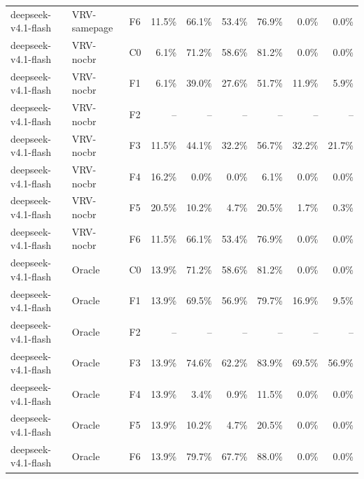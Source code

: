 \begin{tabular}{lllrrrrrr}
deepseek-v4.1-flash & VRV-samepage & F6 & 11.5\% & 66.1\% & 53.4\% & 76.9\% & 0.0\% & 0.0\% \\
deepseek-v4.1-flash & VRV-nocbr & C0 & 6.1\% & 71.2\% & 58.6\% & 81.2\% & 0.0\% & 0.0\% \\
deepseek-v4.1-flash & VRV-nocbr & F1 & 6.1\% & 39.0\% & 27.6\% & 51.7\% & 11.9\% & 5.9\% \\
deepseek-v4.1-flash & VRV-nocbr & F2 & -- & -- & -- & -- & -- & -- \\
deepseek-v4.1-flash & VRV-nocbr & F3 & 11.5\% & 44.1\% & 32.2\% & 56.7\% & 32.2\% & 21.7\% \\
deepseek-v4.1-flash & VRV-nocbr & F4 & 16.2\% & 0.0\% & 0.0\% & 6.1\% & 0.0\% & 0.0\% \\
deepseek-v4.1-flash & VRV-nocbr & F5 & 20.5\% & 10.2\% & 4.7\% & 20.5\% & 1.7\% & 0.3\% \\
deepseek-v4.1-flash & VRV-nocbr & F6 & 11.5\% & 66.1\% & 53.4\% & 76.9\% & 0.0\% & 0.0\% \\
deepseek-v4.1-flash & Oracle & C0 & 13.9\% & 71.2\% & 58.6\% & 81.2\% & 0.0\% & 0.0\% \\
deepseek-v4.1-flash & Oracle & F1 & 13.9\% & 69.5\% & 56.9\% & 79.7\% & 16.9\% & 9.5\% \\
deepseek-v4.1-flash & Oracle & F2 & -- & -- & -- & -- & -- & -- \\
deepseek-v4.1-flash & Oracle & F3 & 13.9\% & 74.6\% & 62.2\% & 83.9\% & 69.5\% & 56.9\% \\
deepseek-v4.1-flash & Oracle & F4 & 13.9\% & 3.4\% & 0.9\% & 11.5\% & 0.0\% & 0.0\% \\
deepseek-v4.1-flash & Oracle & F5 & 13.9\% & 10.2\% & 4.7\% & 20.5\% & 0.0\% & 0.0\% \\
deepseek-v4.1-flash & Oracle & F6 & 13.9\% & 79.7\% & 67.7\% & 88.0\% & 0.0\% & 0.0\% \\
\bottomrule
\end{tabular}

